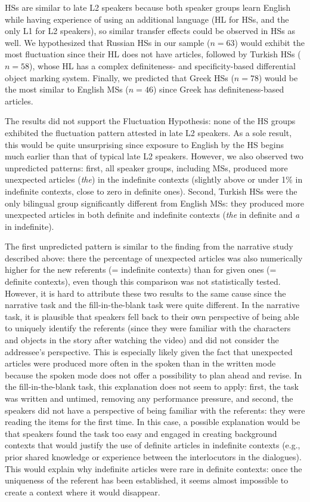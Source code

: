 \documentclass[output=paper,colorlinks,citecolor=brown]{langscibook}
\begin{document}
HSs are similar to late L2 speakers because both speaker groups learn English while having experience of using an additional language (HL for HSs, and the only L1 for L2 speakers), so similar transfer effects could be observed in HSs as well. We hypothesized that Russian HSs in our sample ($n=63$) would exhibit the most fluctuation since their HL does not have articles, followed by Turkish HSs ($n=58$), whose HL has a complex definiteness- and specificity-based differential object marking system. Finally, we predicted that Greek HSs ($n=78$) would be the most similar to English MSs ($n=46$) since Greek has definiteness-based articles.

The results did not support the Fluctuation Hypothesis: none of the HS groups exhibited the fluctuation pattern attested in late L2 speakers. As a sole result, this would be quite unsurprising since exposure to English by the HS begins much earlier than that of typical late L2 speakers. However, we also observed two unpredicted patterns: first, all speaker groups, including MSs, produced more unexpected articles (\textit{the}) in the indefinite contexts (slightly above or under 1\% in indefinite contexts, close to zero in definite ones). Second, Turkish HSs were the only bilingual group significantly different from English MSs: they produced more unexpected articles in both definite and indefinite contexts (\textit{the} in definite and \textit{a} in indefinite).

The first unpredicted pattern is similar to the finding from the narrative study described above: there the percentage of unexpected articles was also numerically higher for the new referents (= indefinite contexts) than for given ones (= definite contexts), even though this comparison was not statistically tested. However, it is hard to attribute these two results to the same cause since the narrative task and the fill-in-the-blank task were quite different. In the narrative task, it is plausible that speakers fell back to their own perspective of being able to uniquely identify the referents (since they were familiar with the characters and objects in the story after watching the video) and did not consider the addressee’s perspective. This is especially likely given the fact that unexpected articles were produced more often in the spoken than in the written mode because the spoken mode does not offer a possibility to plan ahead and revise. In the fill-in-the-blank task, this explanation does not seem to apply: first, the task was written and untimed, removing any performance pressure, and second, the speakers did not have a perspective of being familiar with the referents: they were reading the items for the first time. In this case, a possible explanation would be that speakers found the task too easy and engaged in creating background contexts that would justify the use of definite articles in indefinite contexts (e.g., prior shared knowledge or experience between the interlocutors in the dialogues). This would explain why indefinite articles were rare in definite contexts: once the uniqueness of the referent has been established, it seems almost impossible to create a context where it would disappear.
\end{document}
